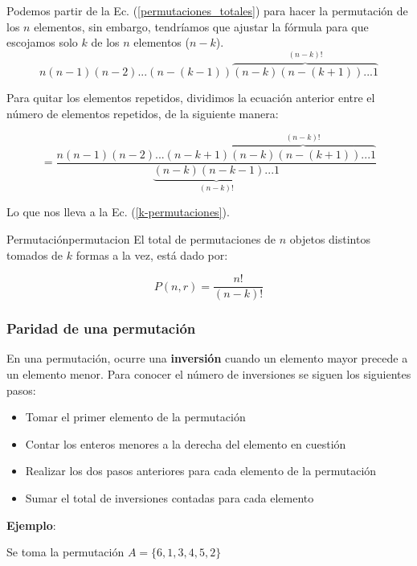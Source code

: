Podemos partir de la Ec. (\ref{permutaciones_totales}) para hacer la permutación
de los $n$ elementos, sin embargo, tendríamos que ajustar la fórmula para que
escojamos solo $k$ de los $n$ elementos ($n-k$).
\begin{equation}
n(n-1)(n-2)...(n-(k-1))\overbrace{(n-k)(n-(k+1))...1}^{(n-k)!}
\end{equation}

Para quitar los elementos repetidos, dividimos la ecuación anterior entre el
número de elementos repetidos, de la siguiente manera:

\begin{equation}
 = \frac{ n (n-1) (n-2) ... (n-k+1) \overbrace{(n-k)(n-(k+1))...1}^{(n-k)!}}{\underbrace{(n-k)(n-k-1) ... 1}_{(n-k)!}}
\end{equation}

Lo que nos lleva a la Ec. (\ref{k-permutaciones}).

\begin{theorem}{Permutación}{permutacion}
El total de permutaciones de $n$ objetos distintos tomados de $k$ formas a la
vez, está dado por:

	\begin{equation}
		P(n,r) = \frac{n!}{(n-k)!}
		\label{k-permutaciones}
	\end{equation}
\end{theorem}


\subsubsection{Paridad de una permutación}

En una permutación, ocurre una \textbf{inversi\'on} cuando un elemento mayor
precede a un elemento menor. Para conocer el n\'umero de inversiones se siguen
los siguientes pasos:

\begin{itemize}
\item Tomar el primer elemento de la permutaci\'on
\item Contar los enteros menores a la derecha del elemento en cuesti\'on
\item Realizar los dos pasos anteriores para cada elemento de la permutaci\'on
\item Sumar el total de inversiones contadas para cada elemento
\end{itemize}

\textbf{Ejemplo}:

Se toma la permutación \textbf{$A=\{6,1,3,4,5,2\}$}\\

